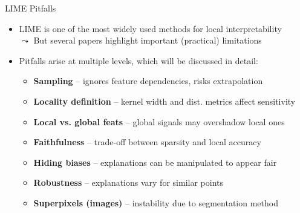 \documentclass[10pt,compress,t,notes=noshow, xcolor=table]{beamer}
\begin{document}
\begin{frame}{LIME Pitfalls}
  \begin{itemize}
  	\item %
  	LIME is one of the most widely used methods for local interpretability\\ 
  	$\leadsto$ But several papers highlight important (practical) limitations
  	\item Pitfalls arise at multiple levels, which will be discussed in detail:
    \begin{itemize}
  \item \textbf{Sampling} -- ignores feature dependencies, risks extrapolation
  \item \textbf{Locality definition} -- kernel width and dist. metrics affect sensitivity
  \item \textbf{Local vs. global feats} -- global signals may overshadow local ones
  \item \textbf{Faithfulness} -- trade-off between sparsity and local accuracy
  \item \textbf{Hiding biases} -- explanations can be manipulated to appear fair
  \item \textbf{Robustness} -- explanations vary for similar points
  \item \textbf{Superpixels (images)} -- instability due to segmentation method
\end{itemize}
  \end{itemize}
  
\end{frame}
  
\end{document}
